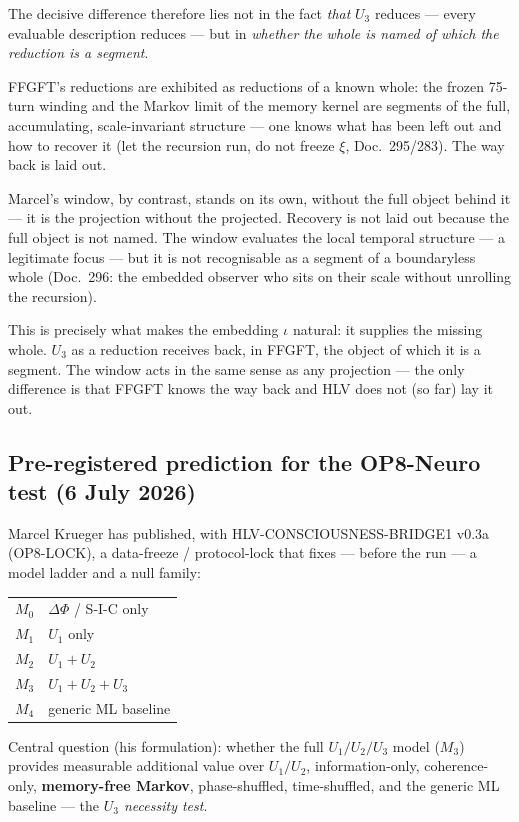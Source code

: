 The decisive difference therefore lies not in the fact \emph{that} $U_3$
reduces --- every evaluable description reduces --- but in \emph{whether the
whole is named of which the reduction is a segment}.

FFGFT's reductions are exhibited as reductions of a known whole: the frozen
75-turn winding and the Markov limit of the memory kernel are segments of
the full, accumulating, scale-invariant structure --- one knows what has
been left out and how to recover it (let the recursion run, do not freeze
$\xi$, Doc.~295/283). The way back is laid out.

Marcel's window, by contrast, stands on its own, without the full object
behind it --- it is the projection without the projected. Recovery is not
laid out because the full object is not named. The window evaluates the
local temporal structure --- a legitimate focus --- but it is not
recognisable as a segment of a boundaryless whole (Doc.~296: the embedded
observer who sits on their scale without unrolling the recursion).

This is precisely what makes the embedding $\iota$ natural: it supplies the
missing whole. $U_3$ as a reduction receives back, in FFGFT, the object of
which it is a segment. The window acts in the same sense as any projection
--- the only difference is that FFGFT knows the way back and HLV does not
(so far) lay it out.

\subsection*{Pre-registered prediction for the OP8-Neuro test (6 July 2026)}

Marcel Krueger has published, with HLV-CONSCIOUSNESS-BRIDGE1 v0.3a
(OP8-LOCK), a data-freeze / protocol-lock that fixes --- before the run ---
a model ladder and a null family:
\begin{center}
\begin{tabular}{ll}
$M_0$ & $\Delta\Phi$ / S-I-C only \\
$M_1$ & $U_1$ only \\
$M_2$ & $U_1 + U_2$ \\
$M_3$ & $U_1 + U_2 + U_3$ \\
$M_4$ & generic ML baseline
\end{tabular}
\end{center}
Central question (his formulation): whether the full $U_1/U_2/U_3$ model
($M_3$) provides measurable additional value over $U_1/U_2$, information-only,
coherence-only, \textbf{memory-free Markov}, phase-shuffled, time-shuffled,
and the generic ML baseline --- the \emph{$U_3$ necessity test}.

